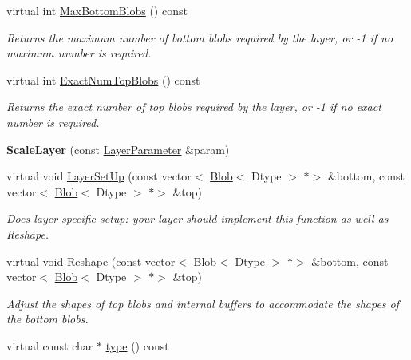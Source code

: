 \begin{DoxyCompactItemize}
virtual int \mbox{\hyperlink{classcaffe_1_1_scale_layer_a7867d035776f78fe486ce633ec0520ad}{Max\+Bottom\+Blobs}} () const
\begin{DoxyCompactList}\small\item\em Returns the maximum number of bottom blobs required by the layer, or -\/1 if no maximum number is required. \end{DoxyCompactList}\item 
virtual int \mbox{\hyperlink{classcaffe_1_1_scale_layer_aeffb8fcfc522f7365c23b0e6ae5c232e}{Exact\+Num\+Top\+Blobs}} () const
\begin{DoxyCompactList}\small\item\em Returns the exact number of top blobs required by the layer, or -\/1 if no exact number is required. \end{DoxyCompactList}\item 
\mbox{\label{classcaffe_1_1_scale_layer_a5af2dfc1148383c6e8073c9660d2b88b}} 
{\bfseries Scale\+Layer} (const \mbox{\hyperlink{classcaffe_1_1_layer_parameter}{Layer\+Parameter}} \&param)
\item 
virtual void \mbox{\hyperlink{classcaffe_1_1_scale_layer_ae3c263f882a7552fe9e88b2d2827cb29}{Layer\+Set\+Up}} (const vector$<$ \mbox{\hyperlink{classcaffe_1_1_blob}{Blob}}$<$ Dtype $>$ $\ast$$>$ \&bottom, const vector$<$ \mbox{\hyperlink{classcaffe_1_1_blob}{Blob}}$<$ Dtype $>$ $\ast$$>$ \&top)
\begin{DoxyCompactList}\small\item\em Does layer-\/specific setup\+: your layer should implement this function as well as Reshape. \end{DoxyCompactList}\item 
virtual void \mbox{\hyperlink{classcaffe_1_1_scale_layer_a40101bfc91fea909fdc9047c3618d07d}{Reshape}} (const vector$<$ \mbox{\hyperlink{classcaffe_1_1_blob}{Blob}}$<$ Dtype $>$ $\ast$$>$ \&bottom, const vector$<$ \mbox{\hyperlink{classcaffe_1_1_blob}{Blob}}$<$ Dtype $>$ $\ast$$>$ \&top)
\begin{DoxyCompactList}\small\item\em Adjust the shapes of top blobs and internal buffers to accommodate the shapes of the bottom blobs. \end{DoxyCompactList}\item 
\mbox{\label{classcaffe_1_1_scale_layer_a73f354bbf33da4836b4816f4df6bd7cf}} 
virtual const char $\ast$ \mbox{\hyperlink{classcaffe_1_1_scale_layer_a73f354bbf33da4836b4816f4df6bd7cf}{type}} () const

\end{DoxyCompactItemize}
